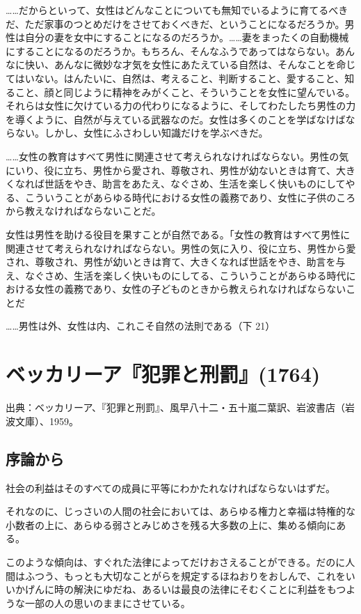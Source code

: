 ……だからといって、女性はどんなことについても無知でいるように育てるべきだ、ただ家事のつとめだけをさせておくべきだ、ということになるだろうか。男性は自分の妻を女中にすることになるのだろうか。……妻をまったくの自動機械にすることになるのだろうか。もちろん、そんなふうであってはならない。あんなに快い、あんなに微妙な才気を女性にあたえている自然は、そんなことを命じてはいない。はんたいに、自然は、考えること、判断すること、愛すること、知ること、顔と同じように精神をみがくこと、そういうことを女性に望んでいる。それらは女性に欠けている力の代わりになるように、そしてわたしたち男性の力を導くように、自然が与えている武器なのだ。女性は多くのことを学ばなけばならない。しかし、女性にふさわしい知識だけを学ぶべきだ。

……女性の教育はすべて男性に関連させて考えられなければならない。男性の気にいり、役に立ち、男性から愛され、尊敬され、男性が幼ないときは育て、大きくなれば世話をやき、助言をあたえ、なぐさめ、生活を楽しく快いものにしてやる、こういうことがあらゆる時代における女性の義務であり、女性に子供のころから教えなければならないことだ。


女性は男性を助ける役目を果すことが自然である。「女性の教育はすべて男性に関連させて考えられなければならない。男性の気に入り、役に立ち、男性から愛され、尊敬され、男性が幼いときは育て、大きくなれば世話をやき、助言を与え、なぐさめ、生活を楽しく快いものにしてる、こういうことがあらゆる時代における女性の義務であり、女性の子どものときから教えられなければならないことだ


……男性は外、女性は内、これこそ自然の法則である（下 21）

\newpage{}


\section{ベッカリーア『犯罪と刑罰』(1764)}

出典：ベッカリーア、『犯罪と刑罰』、風早八十二・五十嵐二葉訳、岩波書店（岩波文庫）、1959。


\subsection{序論から}


社会の利益はそのすべての成員に平等にわかたれなければならないはずだ。

それなのに、じっさいの人間の社会においては、あらゆる権力と幸福は特権的な小数者の上に、あらゆる弱さとみじめさを残る大多数の上に、集める傾向にある。

このような傾向は、すぐれた法律によってだけおさえることができる。だのに人間はふつう、もっとも大切なことがらを規定するほねおりをおしんで、これをいいかげんに時の解決にゆだね、あるいは最良の法律にそむくことに利益をもつような一部の人の思いのままにさせている。

